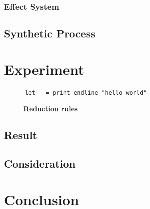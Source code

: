 \documentclass[12pt, a4paper, titlepage]{report}
\begin{document}
    \subsection{Effect System}
  \section{Synthetic Process}\label{section:syntheticProcess}

\chapter{Experiment}\label{chapter:experiment}
    \cite{pierce:2002}
    \begin{verbatim}
      let _ = print_endline "hello world"
    \end{verbatim}
    \begin{figure}[htbp]
      \begin{flushleft}
        \textbf{Reduction rules} \quad {}
      \end{flushleft}
      \begin{center}
        \begin{prooftree}
          \end{prooftree}
          \hfil
          \begin{prooftree}
          \end{prooftree}
      \end{center}
    \end{figure}
  \section{Result}
  \section{Consideration}

\chapter{Conclusion}\label{chapter:conclusion}



\end{document}
